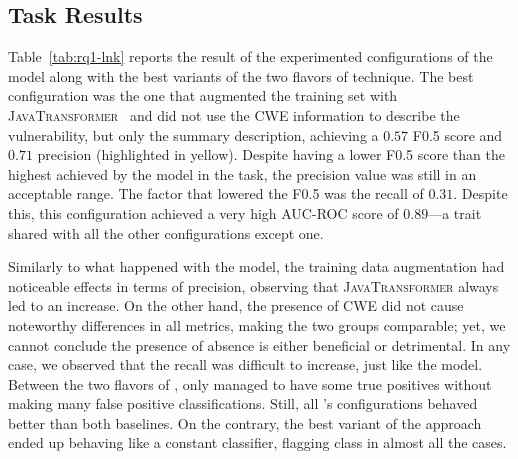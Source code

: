 \subsection{\matching Task Results}
\label{subsec:match-results}


Table~\ref{tab:rq1-lnk} reports the result of the \linkerConfigsLetter experimented configurations of the \linker model along with the best variants of the two flavors of \simil technique.
%
The best configuration was the one that augmented the training set with \textsc{JavaTransformer}~\cite{rabin:ist2021:javatransformer} and did not use the CWE information to describe the vulnerability, but only the summary description, achieving a $0.57$ F0.5 score and $0.71$ precision (highlighted in yellow).
Despite having a lower F0.5 score than the highest achieved by the \finder model in the \finding task, the precision value was still in an acceptable range.
The factor that lowered the F0.5 was the recall of $0.31$.
Despite this, this configuration achieved a very high AUC-ROC score of $0.89$---a trait shared with all the other configurations except one.

Similarly to what happened with the \finder model, the training data augmentation had noticeable effects in terms of precision, observing that \textsc{JavaTransformer} always led to an increase.
On the other hand, the presence of CWE did not cause noteworthy differences in all metrics, making the two groups comparable; yet, we cannot conclude the presence of absence is either beneficial or detrimental.
In any case, we observed that the recall was difficult to increase, just like the \finder model.
%
Between the two flavors of \simil, only \yakeSimil managed to have some true positives without making many false positive classifications.
Still, all \linker's configurations behaved better than both baselines.
On the contrary, the best variant of the \codebertSimil approach ended up behaving like a constant classifier, flagging class \linkerPosClass in almost all the cases. 

